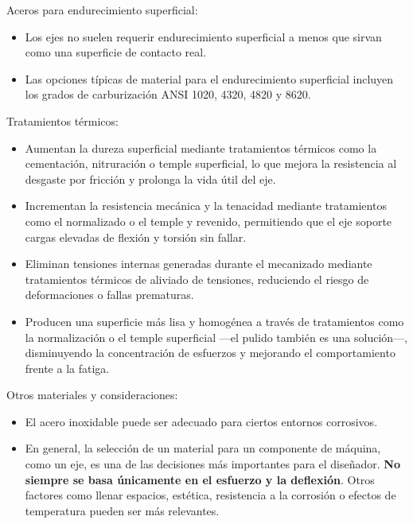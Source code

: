 \documentclass[spanish,11pt,a4paper]{article}
\begin{document}
	Aceros para endurecimiento superficial:
	\begin{itemize}
	\item Los ejes no suelen requerir endurecimiento superficial a menos que sirvan como una superficie de contacto real.
	\item Las opciones típicas de material para el endurecimiento superficial incluyen los grados de carburización ANSI 1020, 4320, 4820 y 8620.
	\end{itemize}
	
	Tratamientos térmicos:
	\begin{itemize}
		\item Aumentan la dureza superficial mediante tratamientos térmicos como la cementación, nitruración o temple superficial, lo que mejora la resistencia al desgaste por fricción y prolonga la vida útil del eje.
		\item Incrementan la resistencia mecánica y la tenacidad mediante tratamientos como el normalizado o el temple y revenido, permitiendo que el eje soporte cargas elevadas de flexión y torsión sin fallar.
		\item Eliminan tensiones internas generadas durante el mecanizado mediante tratamientos térmicos de aliviado de tensiones, reduciendo el riesgo de deformaciones o fallas prematuras.
		\item Producen una superficie más lisa y homogénea a través de tratamientos como la normalización o el temple superficial —el pulido también es una solución—, disminuyendo la concentración de esfuerzos y mejorando el comportamiento frente a la fatiga.
	\end{itemize}
	
	
	
	Otros materiales y consideraciones:
	\begin{itemize}
		\item El acero inoxidable puede ser adecuado para ciertos entornos corrosivos.
		\item En general, la selección de un material para un componente de máquina, como un eje, es una de las decisiones más importantes para el diseñador. \textbf{No siempre se basa únicamente en el esfuerzo y la deflexión}. Otros factores como llenar espacios, estética, resistencia a la corrosión o efectos de temperatura pueden ser más relevantes.
	\end{itemize}
	
	
	
\end{document}
